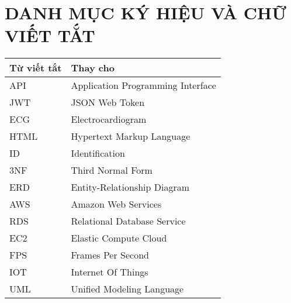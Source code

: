 


\clearpage
\pagestyle{empty} %
{}
\tableofcontents %
\clearpage
\pagestyle{plain} %
\thispagestyle{empty}
\thispagestyle{empty}
\cleardoublepage

\section*{DANH MỤC KÝ HIỆU VÀ CHỮ VIẾT TẮT}%



\begin{table}[H]
  \centering
  \begin{tabularx}{0.85\textwidth}{
  | >{\centering\arraybackslash}m{3cm}
  | >{\centering\arraybackslash}X|
  }
  \hline
  \bfseries Từ viết tắt     &\bfseries Thay cho\hspace{1cm}\\ \hline
  API     & Application Programming Interface \\ \hline
  JWT  & JSON Web Token \\ \hline
  ECG   & Electrocardiogram \\ \hline
  HTML   & Hypertext Markup Language \\ \hline
  ID    & Identification \\ \hline
  3NF   & Third Normal Form \\ \hline
  ERD     & Entity-Relationship Diagram \\ \hline
  AWS  & Amazon Web Services \\ \hline
  RDS   & Relational Database Service \\ \hline
  EC2   & Elastic Compute Cloud \\ \hline
  FPS   & Frames Per Second \\ \hline
  IOT   & Internet Of Things \\ \hline
  UML   & Unified Modeling Language \\ \hline

  
  \end{tabularx}
  \label{bang31}
\end{table}


\cleardoublepage

{
\let\oldnumberline\numberline
\renewcommand{\numberline}{\figurename~\oldnumberline}%
\listoffigures
} %
\cleardoublepage

{
\let\oldnumberline\numberline
\renewcommand{\numberline}{\tablename~\oldnumberline}%
\listoftables
} %
\cleardoublepage
